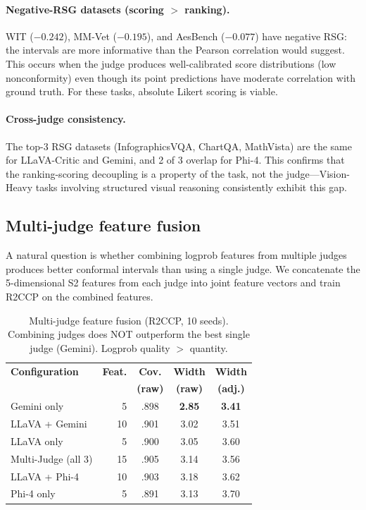 \documentclass{article}
\begin{document}
\paragraph{Negative-RSG datasets (scoring $>$ ranking).} WIT ($-0.242$), MM-Vet ($-0.195$), and AesBench ($-0.077$) have negative RSG: the intervals are more informative than the Pearson correlation would suggest. This occurs when the judge produces well-calibrated score distributions (low nonconformity) even though its point predictions have moderate correlation with ground truth. For these tasks, absolute Likert scoring is viable.

\paragraph{Cross-judge consistency.} The top-3 RSG datasets (InfographicsVQA, ChartQA, MathVista) are the same for LLaVA-Critic and Gemini, and 2 of 3 overlap for Phi-4. This confirms that the ranking-scoring decoupling is a property of the task, not the judge---Vision-Heavy tasks involving structured visual reasoning consistently exhibit this gap.

\subsection{Multi-judge feature fusion}
\label{sec:multijudge}

A natural question is whether combining logprob features from multiple judges produces better conformal intervals than using a single judge. We concatenate the 5-dimensional S2 features from each judge into joint feature vectors and train R2CCP on the combined features.

\begin{table}[t]
\centering
\caption{Multi-judge feature fusion (R2CCP, 10 seeds). Combining judges does NOT outperform the best single judge (Gemini). Logprob quality $>$ quantity.}
\label{tab:multijudge}
\small
\begin{tabular}{lrccc}
\toprule
\textbf{Configuration} & \textbf{Feat.} & \textbf{Cov.} & \textbf{Width} & \textbf{Width} \\
& & \textbf{(raw)} & \textbf{(raw)} & \textbf{(adj.)} \\
\midrule
Gemini only & 5 & .898 & \textbf{2.85} & \textbf{3.41} \\
LLaVA + Gemini & 10 & .901 & 3.02 & 3.51 \\
LLaVA only & 5 & .900 & 3.05 & 3.60 \\
Multi-Judge (all 3) & 15 & .905 & 3.14 & 3.56 \\
LLaVA + Phi-4 & 10 & .903 & 3.18 & 3.62 \\
Phi-4 only & 5 & .891 & 3.13 & 3.70 \\
\bottomrule
\end{tabular}
\end{table}
\end{document}
